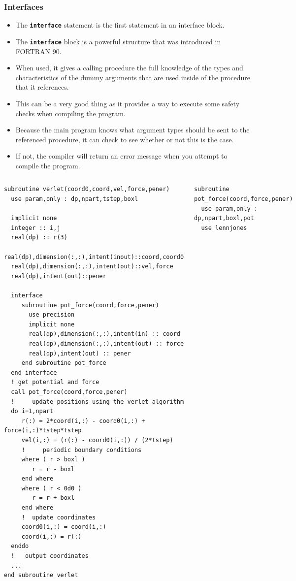 \documentclass[slidestop,mathserif,compress,xcolor=svgnames]{beamer}
\newenvironment{eblock}[0]
{
\begin{beamerboxesrounded}[upper=uppercol2,lower=lowercol2,shadow=true]}
{\end{beamerboxesrounded}}
\begin{document}
\begin{frame}
  \frametitle{\small Interfaces}
  \begin{itemize}
    \item The \textbf{\texttt{interface}} statement is the first statement in an interface block.
    \item The \textbf{\texttt{interface}} block is a powerful structure that was introduced in FORTRAN 90.
    \item When used, it gives a calling procedure the full knowledge of the types and characteristics of the dummy arguments that are used inside of the procedure that it references.
    \item This can be a very good thing as it provides a way to execute some safety checks when compiling the program. 
    \item Because the main program knows what argument types should be sent to the referenced procedure, it can check to see whether or not this is the case.
    \item If not, the compiler will return an error message when you attempt to compile the program.
  \end{itemize}
  \framebreak
  {\fontsize{4}{5}
    \begin{columns}
      \column{5.5cm}
      \vspace{-0.4cm}
      \begin{eblock}{}
        \begin{verbatim}
subroutine verlet(coord0,coord,vel,force,pener)
  use param,only : dp,npart,tstep,boxl

  implicit none
  integer :: i,j
  real(dp) :: r(3)
  real(dp),dimension(:,:),intent(inout)::coord,coord0
  real(dp),dimension(:,:),intent(out)::vel,force
  real(dp),intent(out)::pener

  interface
     subroutine pot_force(coord,force,pener)
       use precision
       implicit none
       real(dp),dimension(:,:),intent(in) :: coord
       real(dp),dimension(:,:),intent(out) :: force
       real(dp),intent(out) :: pener
     end subroutine pot_force
  end interface
  ! get potential and force
  call pot_force(coord,force,pener)
  !     update positions using the verlet algorithm
  do i=1,npart
     r(:) = 2*coord(i,:) - coord0(i,:) + force(i,:)*tstep*tstep
     vel(i,:) = (r(:) - coord0(i,:)) / (2*tstep)
     !     periodic boundary conditions
     where ( r > boxl ) 
        r = r - boxl
     end where
     where ( r < 0d0 )
        r = r + boxl
     end where
     !  update coordinates
     coord0(i,:) = coord(i,:)
     coord(i,:) = r(:)
  enddo
  !   output coordinates
  ...
end subroutine verlet
        \end{verbatim}
      \end{eblock}
      \column{5.5cm}
      \vspace{-0.4cm}
      \begin{eblock}{}
        \begin{verbatim}
subroutine pot_force(coord,force,pener)
  use param,only : dp,npart,boxl,pot
  use lennjones


\end{verbatim}
\end{eblock}
\end{columns}}
\end{frame}
\end{document}
